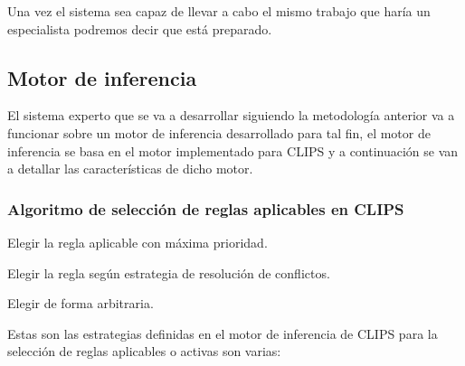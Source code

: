 Una vez el sistema sea capaz de llevar a cabo el mismo trabajo que haría un especialista
 podremos decir que está preparado.



\subsection{Motor de inferencia}
El sistema experto que se va a desarrollar siguiendo la metodología anterior va
 a funcionar sobre un motor de inferencia desarrollado para tal fin, el motor
 de inferencia se basa en el motor implementado para CLIPS y a continuación se van
 a detallar las características de dicho motor.

\subsubsection{Algoritmo de selección de reglas aplicables en CLIPS}
\begin{compactitem}
  \item Elegir la regla aplicable con máxima prioridad.
  \item Elegir la regla según estrategia de resolución de conflictos.
  \item Elegir de forma arbitraria.
\end{compactitem}

Estas son las estrategias definidas en el motor de inferencia de CLIPS para
 la selección de reglas aplicables o activas son varias:


